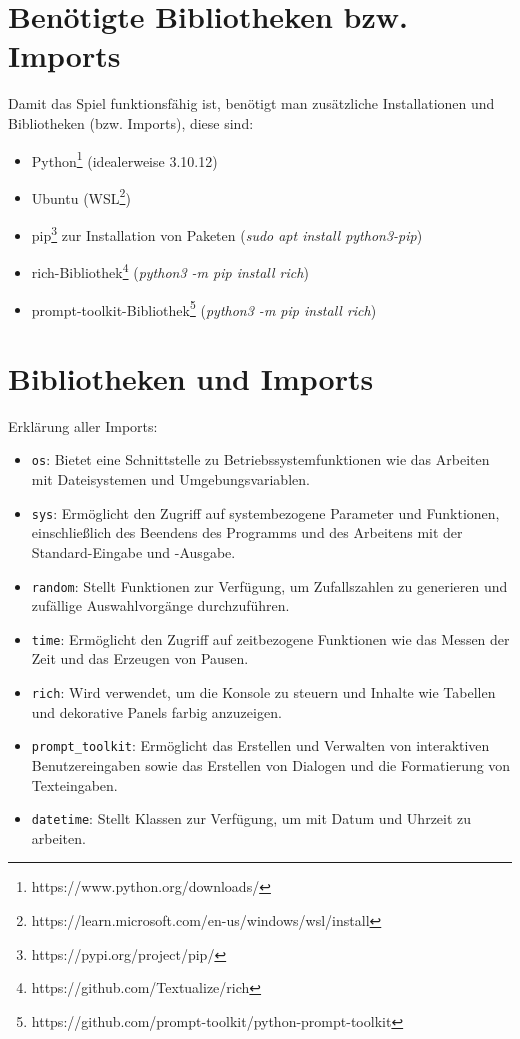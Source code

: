\documentclass{llncs}
\begin{document}
\section{Benötigte Bibliotheken bzw. Imports}

Damit das Spiel funktionsfähig ist, benötigt man zusätzliche Installationen und Bibliotheken (bzw. Imports), diese sind: 
\begin{itemize} 
    \item Python\footnote{https://www.python.org/downloads/} (idealerweise 3.10.12)
    \item Ubuntu (WSL\footnote{https://learn.microsoft.com/en-us/windows/wsl/install})
    \item pip\footnote{https://pypi.org/project/pip/} zur Installation von Paketen (\textit{sudo apt install python3-pip})
    \item rich-Bibliothek\footnote{https://github.com/Textualize/rich} (\textit{python3 -m pip install rich})
    \item prompt-toolkit-Bibliothek\footnote{https://github.com/prompt-toolkit/python-prompt-toolkit} (\textit{python3 -m pip install rich})

\end{itemize}

\section{Bibliotheken und Imports}

Erklärung aller Imports:

\begin{itemize}
    \item \texttt{os}: Bietet eine Schnittstelle zu Betriebssystemfunktionen wie das Arbeiten mit Dateisystemen und Umgebungsvariablen.
    \item \texttt{sys}: Ermöglicht den Zugriff auf systembezogene Parameter und Funktionen, einschließlich des Beendens des Programms und des Arbeitens mit der Standard-Eingabe und -Ausgabe.
    \item \texttt{random}: Stellt Funktionen zur Verfügung, um Zufallszahlen zu generieren und zufällige Auswahlvorgänge durchzuführen.
    \item \texttt{time}: Ermöglicht den Zugriff auf zeitbezogene Funktionen wie das Messen der Zeit und das Erzeugen von Pausen.
    \item \texttt{rich}: Wird verwendet, um die Konsole zu steuern und Inhalte wie Tabellen und dekorative Panels farbig anzuzeigen.
    \item \texttt{prompt\_toolkit}: Ermöglicht das Erstellen und Verwalten von interaktiven Benutzereingaben sowie das Erstellen von Dialogen und die Formatierung von Texteingaben.
    \item \texttt{datetime}: Stellt Klassen zur Verfügung, um mit Datum und Uhrzeit zu arbeiten.
\end{itemize}
\end{document}
